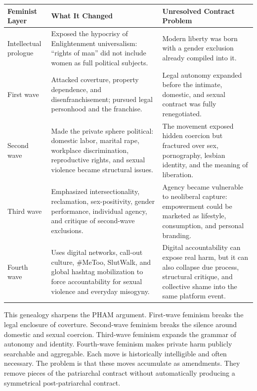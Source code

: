 \documentclass[12pt]{article}
\begin{document}
\begin{longtable}{p{} p{} p{}}
\toprule
\textbf{Feminist Layer} & \textbf{What It Changed} & \textbf{Unresolved Contract Problem} \\
\midrule
\endhead
Intellectual prologue & Exposed the hypocrisy of Enlightenment universalism: ``rights of man'' did not include women as full political subjects. & Modern liberty was born with a gender exclusion already compiled into it. \\
\addlinespace
First wave & Attacked coverture, property dependence, and disenfranchisement; pursued legal personhood and the franchise. & Legal autonomy expanded before the intimate, domestic, and sexual contract was fully renegotiated. \\
\addlinespace
Second wave & Made the private sphere political: domestic labor, marital rape, workplace discrimination, reproductive rights, and sexual violence became structural issues. & The movement exposed hidden coercion but fractured over sex, pornography, lesbian identity, and the meaning of liberation. \\
\addlinespace
Third wave & Emphasized intersectionality, reclamation, sex-positivity, gender performance, individual agency, and critique of second-wave exclusions. & Agency became vulnerable to neoliberal capture: empowerment could be marketed as lifestyle, consumption, and personal branding. \\
\addlinespace
Fourth wave & Uses digital networks, call-out culture, \#MeToo, SlutWalk, and global hashtag mobilization to force accountability for sexual violence and everyday misogyny. & Digital accountability can expose real harm, but it can also collapse due process, structural critique, and collective shame into the same platform event. \\
\bottomrule
\end{longtable}

This genealogy sharpens the PHAM argument. First-wave feminism breaks the legal enclosure of coverture. Second-wave feminism breaks the silence around domestic and sexual coercion. Third-wave feminism expands the grammar of autonomy and identity. Fourth-wave feminism makes private harm publicly searchable and aggregable. Each move is historically intelligible and often necessary. The problem is that these moves accumulate as amendments. They remove pieces of the patriarchal contract without automatically producing a symmetrical post-patriarchal contract.
\end{document}
